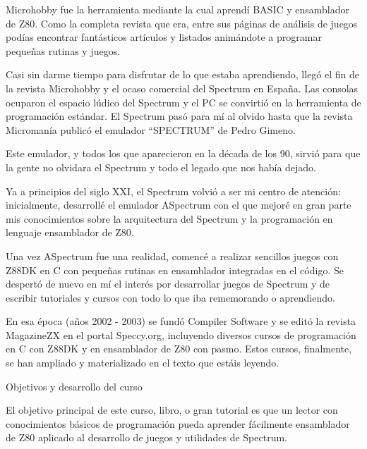 \documentclass[letterpaper,10pt,spanish]{sphinxmanual}
\begin{document}
Microhobby fue la herramienta mediante la cual aprendí BASIC y ensamblador de Z80. Como la completa revista que era, entre sus páginas de análisis de juegos podías encontrar fantásticos artículos y listados animándote a programar pequeñas rutinas y juegos.

Casi sin darme tiempo para disfrutar de lo que estaba aprendiendo, llegó el fin de la revista Microhobby y el ocaso comercial del Spectrum en España. Las consolas ocuparon el espacio lúdico del Spectrum y el PC se convirtió en la herramienta de programación estándar. El Spectrum pasó para mí al olvido hasta que la revista Micromanía publicó el emulador “SPECTRUM” de Pedro Gimeno.

Este emulador, y todos los que aparecieron en la década de los 90, sirvió para que la gente no olvidara el Spectrum y todo el legado que nos había dejado.

Ya a principios del siglo XXI, el Spectrum volvió a ser mi centro de atención: inicialmente, desarrollé el emulador ASpectrum con el que mejoré en gran parte mis conocimientos sobre la arquitectura del Spectrum y la programación en lenguaje ensamblador de Z80.

Una vez ASpectrum fue una realidad, comencé a realizar sencillos juegos con Z88DK en C con pequeñas rutinas en ensamblador integradas en el código. Se despertó de nuevo en mí el interés por desarrollar juegos de Spectrum y de escribir tutoriales y cursos con todo lo que iba rememorando o aprendiendo.

En esa época (años 2002 - 2003) se fundó Compiler Software y se editó la revista MagazineZX en el portal Speccy.org, incluyendo diversos cursos de programación en C con Z88DK y en ensamblador de Z80 con pasmo. Estos cursos, finalmente, se han ampliado y materializado en el texto que estáis leyendo.

Objetivos y desarrollo del curso

El objetivo principal de este curso, libro, o gran tutorial es que un lector con conocimientos básicos de programación pueda aprender fácilmente ensamblador de Z80 aplicado al desarrollo de juegos y utilidades de Spectrum.
\end{document}
